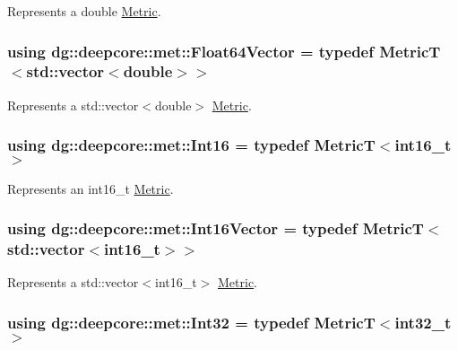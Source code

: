 Represents a {\ttfamily double} \hyperlink{classdg_1_1deepcore_1_1_metric}{Metric}. 

\subsubsection[{\texorpdfstring{Float64\+Vector}{Float64Vector}}]{\setlength{\rightskip}{0pt plus 5cm}using {\bf dg\+::deepcore\+::met\+::\+Float64\+Vector} = typedef MetricT$<$std\+::vector$<$double$>$$>$}\hypertarget{group___process_metrics_ga411093a58279bc6c2a2a4d2e850967d6}{}\label{group___process_metrics_ga411093a58279bc6c2a2a4d2e850967d6}


Represents a {\ttfamily std\+::vector$<$double$>$} \hyperlink{classdg_1_1deepcore_1_1_metric}{Metric}. 

\subsubsection[{\texorpdfstring{Int16}{Int16}}]{\setlength{\rightskip}{0pt plus 5cm}using {\bf dg\+::deepcore\+::met\+::\+Int16} = typedef MetricT$<$int16\+\_\+t$>$}\hypertarget{group___process_metrics_gaa7db3a7893443501f99763fcc0e861ac}{}\label{group___process_metrics_gaa7db3a7893443501f99763fcc0e861ac}


Represents an {\ttfamily int16\+\_\+t} \hyperlink{classdg_1_1deepcore_1_1_metric}{Metric}. 

\subsubsection[{\texorpdfstring{Int16\+Vector}{Int16Vector}}]{\setlength{\rightskip}{0pt plus 5cm}using {\bf dg\+::deepcore\+::met\+::\+Int16\+Vector} = typedef MetricT$<$std\+::vector$<$int16\+\_\+t$>$$>$}\hypertarget{group___process_metrics_ga657cf9643cfa30f7616a44f6d240966c}{}\label{group___process_metrics_ga657cf9643cfa30f7616a44f6d240966c}


Represents a {\ttfamily std\+::vector$<$int16\+\_\+t$>$} \hyperlink{classdg_1_1deepcore_1_1_metric}{Metric}. 

\subsubsection[{\texorpdfstring{Int32}{Int32}}]{\setlength{\rightskip}{0pt plus 5cm}using {\bf dg\+::deepcore\+::met\+::\+Int32} = typedef MetricT$<$int32\+\_\+t$>$}\hypertarget{group___process_metrics_ga9092703cdbc8630f71539fc8c9f8802c}{}\label{group___process_metrics_ga9092703cdbc8630f71539fc8c9f8802c}


